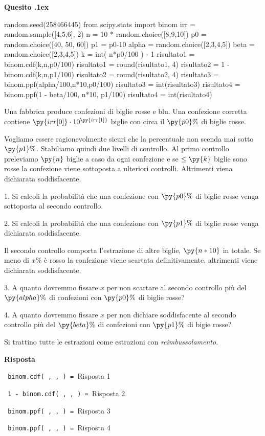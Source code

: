 \documentclass[11pt,twoside,a4paper]{article}
\newcounter{quesito}
\newenvironment{question}{\addtocounter{quesito}{1}\par\textbf{Quesito \thequesito.\kern1ex}}{\vspace{0.5\parskip}}
\newenvironment{answer}{\par\textbf{Risposta\quad}}{\vspace{\parskip}}
\begin{document}
\begin{question}
\def\Pr{{\rm Pr\,}}
\def\Ex{{\rm E\,}}
\def\Var{{\rm Var\,}}
\begin{pycode}
random.seed(258466445)
from scipy.stats import binom
irr = random.sample([4,5,6], 2)
n = 10 * random.choice([8,9,10])
p0 = random.choice([40, 50, 60])
p1 = p0-10
alpha =  random.choice([2,3,4,5])
beta =  random.choice([2,3,4,5])
k = int( n*p0/100 ) - 1
risultato1 = binom.cdf(k,n,p0/100)
risultato1 = round(risultato1, 4)
risultato2 = 1 - binom.cdf(k,n,p1/100)
risultato2 = round(risultato2, 4)
risultato3 = binom.ppf(alpha/100,n*10,p0/100)
risultato3 = int(risultato3)
risultato4 = binom.ppf(1 - beta/100, n*10, p1/100)
risultato4 = int(risultato4)
\end{pycode}
Una fabbrica produce confezioni di biglie rosse e blu. Una confezione corretta contiene $\py{irr[0]}\cdot 10^{\py{irr[1]}}$ biglie con circa il $\py{p0}\%$ di biglie rosse. 

Vogliamo essere ragionevolmente sicuri che la percentuale non scenda mai sotto $\py{p1}\%$.  Stabiliamo quindi due livelli di controllo. 
Al primo controllo preleviamo $\py{n}$ biglie a caso da ogni confezione e se $\le\py{k}$ biglie sono rosse la confezione viene sottoposta a ulteriori controlli. Altrimenti viena dichiarata soddisfacente.

1. Si calcoli la probabilità che una confezione con $\py{p0}\%$ di biglie rosse venga sottoposta al secondo controllo.

2. Si calcoli la probabilità che una confezione con $\py{p1}\%$ di biglie rosse venga dichiarata soddisfacente.

Il secondo controllo comporta l'estrazione di altre biglie,  $\py{n*10}$ in totale. Se meno di $x\%$ è rosso la confezione viene scartata definitivamente, altrimenti viene dichiarata soddisfacente.

3. A quanto dovremmo fissare $x$ per non scartare al secondo controllo più del $\py{alpha}\%$ di confezioni con $\py{p0}\%$ di biglie rosse?

4. A quanto dovremmo fissare $x$ per non dichiare soddisfacente al secondo controllo più del $\py{beta}\%$ di confezioni con $\py{p1}\%$ di bigie rosse?

Si trattino tutte le estrazioni come estrazioni con \textit{reimbussolamento}.

\begin{answer}

{\tt {\color{blue} binom.cdf( , ,  )} = }\hfill  {\color{blue}Risposta 1}

{\tt {\color{blue} 1 - binom.cdf( , ,  )} = }\hfill  {\color{blue}Risposta 2}

{\tt {\color{blue} binom.ppf( , ,  )} = }\hfill  {\color{blue}Risposta 3}

{\tt {\color{blue} binom.ppf( , ,  )} = }\hfill {\color{blue}Risposta 4}

\end{answer}
\end{question}
\end{document}
